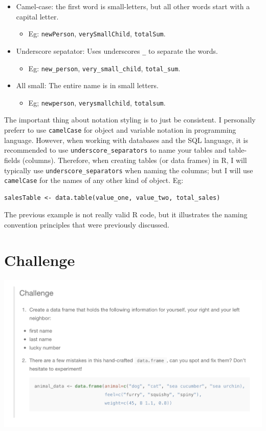 \documentclass[]{book}
\providecommand{\tightlist}{%
  \setlength{\itemsep}{0pt}\setlength{\parskip}{0pt}}
\begin{document}
\begin{itemize}
\tightlist
\item
  Camel-case: the first word is small-letters, but all other words start with a capital letter.

  \begin{itemize}
  \tightlist
  \item
    Eg: \texttt{newPerson}, \texttt{verySmallChild}, \texttt{totalSum}.
  \end{itemize}
\item
  Underscore sepatator: Uses underscores \texttt{\_} to separate the words.

  \begin{itemize}
  \tightlist
  \item
    Eg: \texttt{new\_person}, \texttt{very\_small\_child}, \texttt{total\_sum}.
  \end{itemize}
\item
  All small: The entire name is in small letters.

  \begin{itemize}
  \tightlist
  \item
    Eg; \texttt{newperson}, \texttt{verysmallchild}, \texttt{totalsum}.
  \end{itemize}
\end{itemize}

The important thing about notation styling is to just be consistent. I personally preferr to use \texttt{camelCase} for object and variable notation in programming language. However, when working with databases and the SQL language, it is recommended to use \texttt{underscore\_separators} to name your tables and table-fields (columns). Therefore, when creating tables (or data frames) in R, I will typically use \texttt{underscore\_separators} when naming the columns; but I will use \texttt{camelCase} for the names of any other kind of object. Eg:

\begin{verbatim}
salesTable <- data.table(value_one, value_two, total_sales)
\end{verbatim}

The previous example is not really valid R code, but it illustrates the naming convention principles that were previously discussed.

\hypertarget{challenge}{%
\section{Challenge}\label{challenge}}

\includegraphics{images/challenge1.png}


\end{document}

